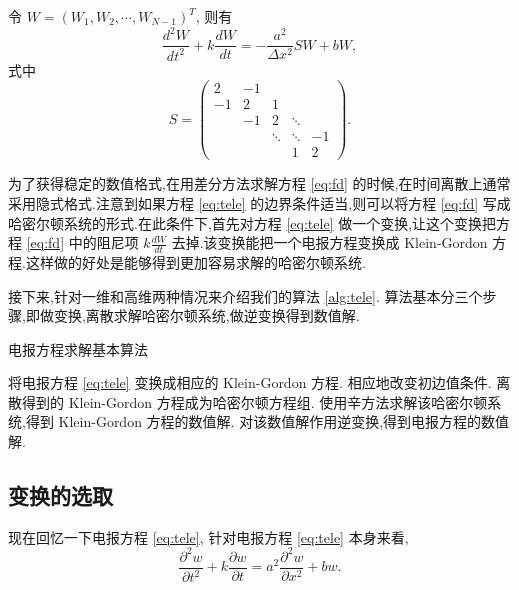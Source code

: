 令 $W=(W_1,W_2,\cdots,W_{N-1})^T$, 则有
\begin{equation}\label{eq:fd}
\frac{d^2 W}{d t^2}+k\frac{d W}{d t}= -\frac{a^2}{\Delta x^2}SW + b W,
\end{equation}
式中
\begin{equation}\label{eq:s}
S=\begin{pmatrix}
2&-1&&&\\
-1&2&1&&\\
&-1&2&\ddots&\\
&&\ddots&\ddots&-1\\
&&&1&2
\end{pmatrix}.
\end{equation}

为了获得稳定的数值格式,在用差分方法求解方程 \eqref{eq:fd} 的时候,在时间离散上通常采用隐式格式.注意到如果方程 \eqref{eq:tele} 的边界条件适当,则可以将方程 \eqref{eq:fd} 写成哈密尔顿系统的形式.在此条件下,首先对方程 \eqref{eq:tele} 做一个变换,让这个变换把方程 \eqref{eq:fd} 中的阻尼项 $k\frac{d W}{d t}$ 去掉.该变换能把一个电报方程变换成 Klein-Gordon 方程.这样做的好处是能够得到更加容易求解的哈密尔顿系统.

接下来,针对一维和高维两种情况来介绍我们的算法 \ref{alg:tele}. 算法基本分三个步骤,即做变换,离散求解哈密尔顿系统,做逆变换得到数值解.

\begin{algorithm}
\caption{电报方程求解基本算法}
\begin{algorithmic}[1]
\STATE 将电报方程 \eqref{eq:tele} 变换成相应的 Klein-Gordon 方程. 相应地改变初边值条件. \newline
\STATE 离散得到的 Klein-Gordon 方程成为哈密尔顿方程组. 使用辛方法求解该哈密尔顿系统,得到 Klein-Gordon 方程的数值解. \newline
\STATE 对该数值解作用逆变换,得到电报方程的数值解.
\end{algorithmic}
\label{alg:tele}
\end{algorithm}

\subsection{变换的选取}\label{sec:02transform}
现在回忆一下电报方程 \eqref{eq:tele}, 针对电报方程 \eqref{eq:tele} 本身来看,
\begin{equation}\label{eq:telegraph}
\frac{\partial ^2 w}{\partial t^2}+k\frac{\partial w}{\partial t}=a^2 \frac{\partial ^2 w}{\partial x^2} + b w.
\end{equation}

